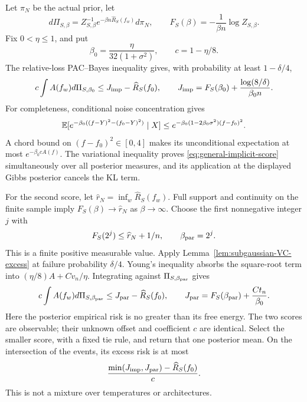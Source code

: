 Let $\pi_N$ be the actual prior, let
\[
 d\Pi_{S,\beta}=Z_{S,\beta}^{-1}e^{-\beta n\widehat R_S(f_w)}d\pi_N,
 \qquad F_S(\beta)=-\frac1{\beta n}\log Z_{S,\beta}.
\]
Fix $0<\eta\le1$, and put
\[
 \beta_0=\frac\eta{32(1+\sigma^2)},\qquad c=1-\eta/8.
\]
The relative-loss PAC--Bayes inequality gives, with probability at least $1-\delta/4$,
\begin{equation}
 c\int A(f_w)d\Pi_{S,\beta_0}
 \le J_{\rm imp}-\widehat R_S(f_0),\qquad
 J_{\rm imp}=F_S(\beta_0)+\frac{\log(8/\delta)}{\beta_0n}.
 \label{eq:general-implicit-score}
\end{equation}
For completeness, conditional noise concentration gives
\[
 \mathbb E[e^{-\beta_0((f-Y)^2-(f_0-Y)^2)}\mid X]
 \le e^{-\beta_0(1-2\beta_0\sigma^2)(f-f_0)^2}.
\]
A chord bound on $(f-f_0)^2\in[0,4]$ makes its unconditional expectation at most $e^{-\beta_0cA(f)}$. The variational inequality proves \eqref{eq:general-implicit-score} simultaneously over all posterior measures, and its application at the displayed Gibbs posterior cancels the KL term.

For the second score, let $\widehat r_N=\inf_w\widehat R_S(f_w)$. Full support and continuity on the finite sample imply $F_S(\beta)\to\widehat r_N$ as $\beta\to\infty$. Choose the first nonnegative integer $j$ with
\[
 F_S(2^j)\le\widehat r_N+1/n,
 \qquad \beta_{\rm par}=2^j.
\]
This is a finite positive measurable value. Apply Lemma~\ref{lem:subgaussian-VC-excess} at failure probability $\delta/4$. Young's inequality absorbs the square-root term into $(\eta/8)A+C v_n/\eta$. Integrating against $\Pi_{S,\beta_{\rm par}}$ gives
\begin{equation}
 c\int A(f_w)d\Pi_{S,\beta_{\rm par}}
 \le J_{\rm par}-\widehat R_S(f_0),\qquad
 J_{\rm par}=F_S(\beta_{\rm par})+\frac{C t_n}{\beta_0}.
 \label{eq:general-parameter-score}
\end{equation}
Here the posterior empirical risk is no greater than its free energy. The two scores are observable; their unknown offset and coefficient $c$ are identical. Select the smaller score, with a fixed tie rule, and return that one posterior mean. On the intersection of the events, its excess risk is at most
\[
 \frac{\min(J_{\rm imp},J_{\rm par})-\widehat R_S(f_0)}c.
\]
This is not a mixture over temperatures or architectures.

